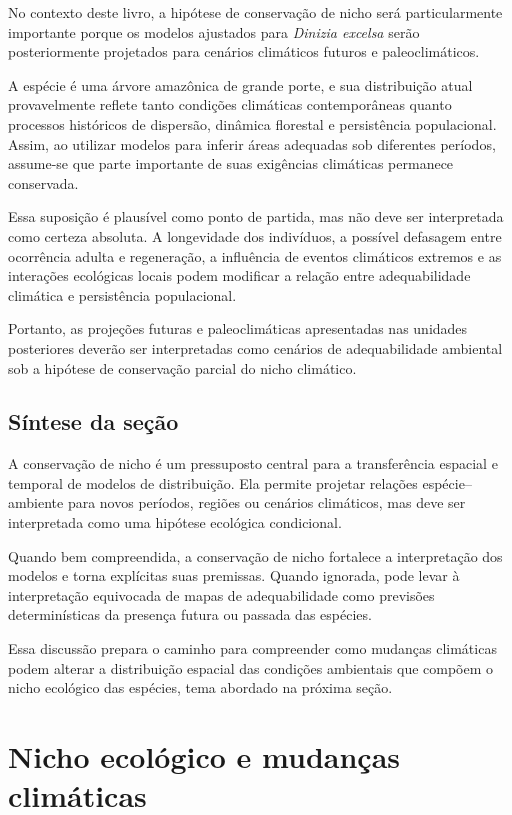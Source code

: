 No contexto deste livro, a hipótese de conservação de nicho será particularmente importante porque os modelos ajustados para \textit{Dinizia excelsa} serão posteriormente projetados para cenários climáticos futuros e paleoclimáticos.

A espécie é uma árvore amazônica de grande porte, e sua distribuição atual provavelmente reflete tanto condições climáticas contemporâneas quanto processos históricos de dispersão, dinâmica florestal e persistência populacional. Assim, ao utilizar modelos para inferir áreas adequadas sob diferentes períodos, assume-se que parte importante de suas exigências climáticas permanece conservada.

Essa suposição é plausível como ponto de partida, mas não deve ser interpretada como certeza absoluta. A longevidade dos indivíduos, a possível defasagem entre ocorrência adulta e regeneração, a influência de eventos climáticos extremos e as interações ecológicas locais podem modificar a relação entre adequabilidade climática e persistência populacional.

Portanto, as projeções futuras e paleoclimáticas apresentadas nas unidades posteriores deverão ser interpretadas como cenários de adequabilidade ambiental sob a hipótese de conservação parcial do nicho climático.

\subsection{Síntese da seção}

A conservação de nicho é um pressuposto central para a transferência espacial e temporal de modelos de distribuição. Ela permite projetar relações espécie--ambiente para novos períodos, regiões ou cenários climáticos, mas deve ser interpretada como uma hipótese ecológica condicional.

Quando bem compreendida, a conservação de nicho fortalece a interpretação dos modelos e torna explícitas suas premissas. Quando ignorada, pode levar à interpretação equivocada de mapas de adequabilidade como previsões determinísticas da presença futura ou passada das espécies.

Essa discussão prepara o caminho para compreender como mudanças climáticas podem alterar a distribuição espacial das condições ambientais que compõem o nicho ecológico das espécies, tema abordado na próxima seção.

\section{Nicho ecológico e mudanças climáticas}

